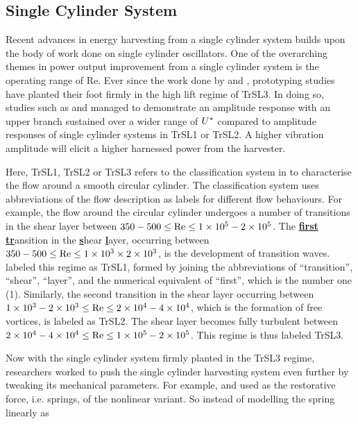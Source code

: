 \documentclass[oneside]{utmthesis}
\begin{document}
\subsection{Single Cylinder System} \label{ssec:singleCylinderHarvester}
Recent advances in energy harvesting from a single cylinder system builds upon the body of work done on single cylinder oscillators. One of the overarching themes in power output improvement from a single cylinder system is the operating range of Re. Ever since the work done by \citet{Bernitsas2008a} and \citet{Bernitsas2009}, prototyping studies have planted their foot firmly in the high lift regime of TrSL3. In doing so, studies such as \citet{Ding2019} and \citet{Park2017} managed to demonstrate an amplitude response with an upper branch sustained over a wider range of $U^{*}$ compared to amplitude responses of single cylinder systems in TrSL1 or TrSL2. A higher vibration amplitude will elicit a higher harnessed power from the harvester.

Here, TrSL1, TrSL2 or TrSL3 refers to the classification system in \citet{Zdravkovich1997} to characterise the flow around a smooth circular cylinder. The classification system uses abbreviations of the flow description as labels for different flow behaviours. For example, the flow around the circular cylinder undergoes a number of transitions in the shear layer between $350 - 500 \leq \text{Re} \leq 1 \times 10^{5} - 2 \times 10^{5}$. The \underline{\textbf{first}} \underline{\textbf{tr}}ansition in the \underline{\textbf{s}}hear \underline{\textbf{l}}ayer, occurring between $350 - 500 \leq \text{Re} \leq 1 \times 10^{3} \times 2 \times 10^{3}$, is the development of transition waves. \citet{Zdravkovich1997} labeled this regime as TrSL1, formed by joining the abbreviations of ``transition'', ``shear'', ``layer'', and the numerical equivalent of ``first'', which is the number one (1). Similarly, the second transition in the shear layer occurring between $1 \times 10^{3} - 2 \times 10^{3} \leq \text{Re} \leq 2 \times 10^{4} - 4 \times 10^{4}$, which is the formation of free vortices, is labeled as TrSL2. The shear layer becomes fully turbulent between $2 \times 10^{4} - 4 \times 10^{4} \leq \text{Re} \leq 1 \times 10^{5} - 2 \times 10^{5}$. This regime is thus labeled TrSL3. 

Now with the single cylinder system firmly planted in the TrSL3 regime, researchers worked to push the single cylinder harvesting system even further by tweaking its mechanical parameters. For example, \citet{Sun2018} and \citet{Ma2018} used as the restorative force, i.e. springs, of the nonlinear variant. So instead of modelling the spring linearly as
\end{document}
